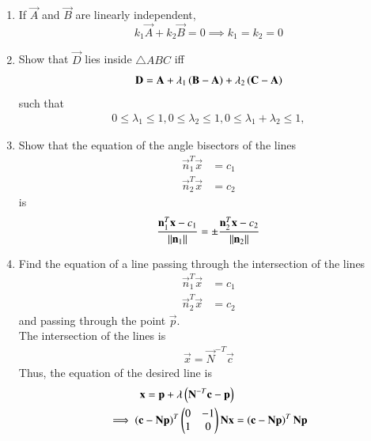 \begin{enumerate}[label=\arabic*.,ref=\thesubsection.\theenumi]
%
\item If $\vec{A}$ and $\vec{B}$ are linearly independent,  
\begin{equation}
k_1\vec{A} + k_2\vec{B} = 0 \implies k_1=k_2=0
\end{equation}
\item Show that $\vec{D}$ lies inside $\triangle ABC$ iff
\begin{align}
\mathbf{D} = \mathbf{A} + \lambda_1\left(\mathbf{B}-\mathbf{A}\right) + \lambda_2\left(\mathbf{C}-\mathbf{A}\right)
\end{align}
such that
\begin{align}
0 \le \lambda_1 \le 1,
0 \le \lambda_2 \le 1,
0 \le \lambda_1+\lambda_2 \le 1,
\end{align}
\item Show that the equation of the angle bisectors of the lines
\begin{align}
\vec{n}_1^T\vec{x} &=c_1
\\
\vec{n}_2^T\vec{x} &=c_2
\end{align}
%
is
\begin{align}
\frac{\mathbf{n}_1^T\mathbf{x}-c_1}{\lVert\mathbf{n}_1\rVert}=\pm\frac{\mathbf{n}_2^T\mathbf{x} -c_2}{\lVert\mathbf{n}_2\rVert}\end{align}
\item Find the equation of a line passing through the intersection of the lines
\begin{align}
\vec{n}_1^T\vec{x} &=c_1
\\
\vec{n}_2^T\vec{x} &=c_2
\end{align}
and passing through the point $\vec{p}$.
\\
\solution The intersection of the lines is 
\begin{align}
\vec{x} = \vec{N}^{-T}\vec{c}
\end{align}
%
Thus, the equation of the desired line is 
\begin{align}
\mathbf{x} = \mathbf{p}+ \lambda\left(\mathbf{N}^{-T}\mathbf{c}-\mathbf{p}\right)&
\\
\implies \left(\mathbf{c}-\mathbf{N}\mathbf{p}\right)^T\begin{pmatrix}0 & -1 \\ 1 & 0\end{pmatrix}\mathbf{N}\mathbf{x} &= \left(\mathbf{c}-\mathbf{N}\mathbf{p}\right)^T\mathbf{N}\mathbf{p}
\end{align}
\end{enumerate}
%
%
